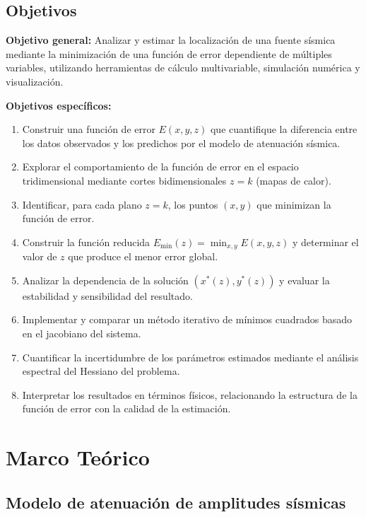 \documentclass[12pt, a4paper]{article}
\begin{document}
\subsection{Objetivos}

\textbf{Objetivo general:} Analizar y estimar la localización de una
fuente sísmica mediante la minimización de una función de error
dependiente de múltiples variables, utilizando herramientas de cálculo
multivariable, simulación numérica y visualización.

\textbf{Objetivos específicos:}
\begin{enumerate}[label=\roman*.]
    \item Construir una función de error $E(x, y, z)$ que cuantifique
    la diferencia entre los datos observados y los predichos por el
    modelo de atenuación sísmica.
    \item Explorar el comportamiento de la función de error en el
    espacio tridimensional mediante cortes bidimensionales $z = k$
    (mapas de calor).
    \item Identificar, para cada plano $z = k$, los puntos $(x, y)$
    que minimizan la función de error.
    \item Construir la función reducida
    $E_{\min}(z) = \min_{x,y} E(x,y,z)$ y determinar el valor de $z$
    que produce el menor error global.
    \item Analizar la dependencia de la solución $(x^*(z), y^*(z))$
    y evaluar la estabilidad y sensibilidad del resultado.
    \item Implementar y comparar un método iterativo de mínimos
    cuadrados basado en el jacobiano del sistema.
    \item Cuantificar la incertidumbre de los parámetros estimados
    mediante el análisis espectral del Hessiano del problema.
    \item Interpretar los resultados en términos físicos, relacionando
    la estructura de la función de error con la calidad de la
    estimación.
\end{enumerate}

\section{Marco Teórico}

\subsection{Modelo de atenuación de amplitudes sísmicas}
\end{document}
